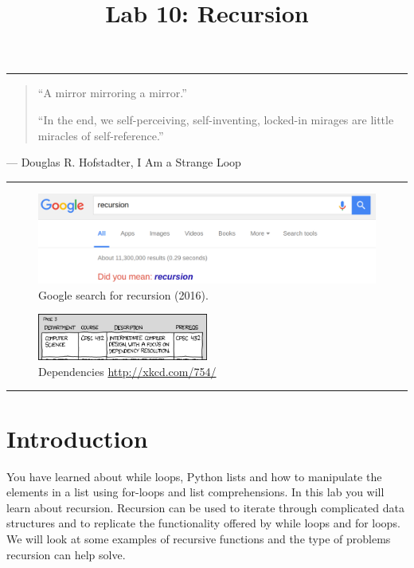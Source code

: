 \documentclass[11pt]{cselabheader}
\title{Lab 10: Recursion}
\begin{document}
\maketitle
{}
\hrule

\begin{quote}
``A mirror mirroring a mirror.''

``In the end, we self-perceiving, self-inventing, locked-in mirages
are little miracles of self-reference.''
\end{quote}
\begin{flushright}
--- Douglas R. Hofstadter, I Am a Strange Loop
\end{flushright}

\hrule

\begin{figure}[H]
  \centering
  \includegraphics[width=\textwidth]{img/didyoumean.png}
  \caption{Google search for recursion (2016).}
\end{figure}

\begin{figure}[H]
  \centering
  \includegraphics[width=0.5\textwidth]{img/xkcd_dependencies.png}
  \caption{Dependencies \url{http://xkcd.com/754/}}
\end{figure}

\hrule

\pagebreak
\section*{Introduction}

You have learned about while loops, Python lists and how to manipulate
the elements in a list using for-loops and list comprehensions.  In
this lab you will learn about recursion.  Recursion can be used to
iterate through complicated data structures and to replicate the
functionality offered by while loops and for loops.  We will look at
some examples of recursive functions and the type of problems
recursion can help solve.
\end{document}
